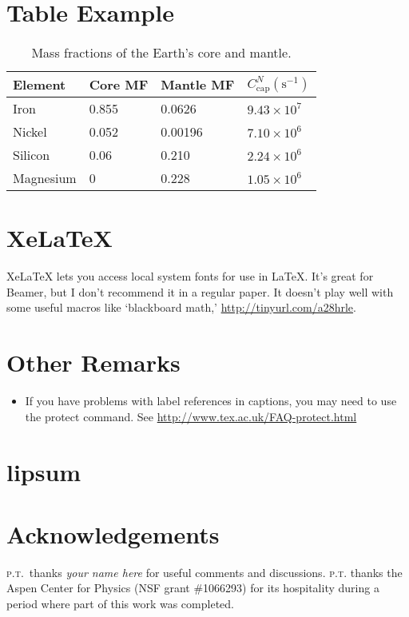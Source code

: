 \documentclass[12pt]{article}
\numberwithin{equation}{section}    %
\begin{document}
\section{Table Example}

 
\begin{table}
	\renewcommand{\arraystretch}{1.3} %
	\centering
	\begin{tabular}{ @{} llll @{} } \toprule %
		Element & Core MF & Mantle MF & $C_\text{cap}^N (\text{s}^{-1})$ 
		\\ \hline
		Iron & 0.855 & 0.0626 & $9.43\times 10^{7}$ 
		\\
		Nickel & 0.052 & 0.00196 & $7.10\times 10^{6}$ 
		\\
		Silicon & 0.06 & 0.210 & $2.24\times 10^{6}$ 
		\\
		Magnesium & 0 & 0.228 & $1.05\times 10^{6}$ 
		\\ \bottomrule
	\end{tabular}
	\caption{
		Mass fractions of the Earth's core and mantle.
		\label{table:elements}
	}
\end{table}


 

\section{XeLaTeX}

XeLaTeX lets you access local system fonts for use in \LaTeX. It's great for Beamer, but I don't recommend it in a regular paper. It doesn't play well with some useful macros like `blackboard math,' \url{http://tinyurl.com/a28hrle}.

\section{Other Remarks}

\begin{itemize}
	\item If you have problems with label references in captions, you may need to use the protect command. See \url{http://www.tex.ac.uk/FAQ-protect.html}
\end{itemize}

\section{lipsum}
 
 \lipsum[3-5]

\section*{Acknowledgements}


%
\textsc{p.t.}\ thanks 
\emph{your name here}
for useful comments and discussions. 
%
\textsc{p.t.} thanks the Aspen Center for Physics (NSF grant \#1066293) for its hospitality during a period where part of this work was completed.



% 
\end{document}
